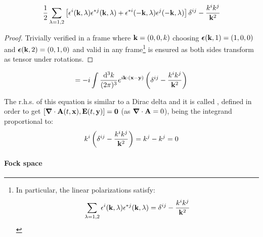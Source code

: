 %
%
\begin{lemma}[before upper = {\tcbtitle}]{}{}
  \begin{equation}
    \frac{1}{2} \sum_{\lambda = 1,2} \left[ \epsilon^i(\mathbf{k},\lambda) \epsilon^{*j}(\mathbf{k},\lambda) + \epsilon^{*i}(-\mathbf{k},\lambda) \epsilon^j(-\mathbf{k},\lambda) \right] \delta^{ij} - \frac{k^i k^j}{\mathbf{k}^2}
  \end{equation}
\end{lemma}

\begin{proofbox}
  \begin{proof}
    Trivially verified in a frame where $ \mathbf{k} = (0,0,k) $ choosing $ \boldsymbol{\epsilon}(\mathbf{k},1) = (1,0,0) $ and $ \boldsymbol{\epsilon}(\mathbf{k},2) = (0,1,0) $ and valid in any frame\footnote{In particular, the linear polarizations satisfy:
    \begin{equation}
      \sum_{\lambda = 1,2} \epsilon^i(\mathbf{k},\lambda) \epsilon^{*j}(\mathbf{k},\lambda) = \delta^{ij} - \frac{k^i k^j}{\mathbf{k}^2}
    \end{equation}} is ensured as both sides transform as tensor under rotations.
  \end{proof}
\end{proofbox}

\begin{proposition}[before upper = {\tcbtitle}]{}{}
  \begin{equation}
    [A^i(t,\ve{x}) , E^j(t,\ve{y})] = - i \int \frac{\dd^3k}{(2\pi)^3} e^{i \ve{k} \cdot (\ve{x} - \ve{y})} \left( \delta^{ij} - \frac{k^i k^j}{\ve{k}^2} \right)
  \end{equation}
\end{proposition}

The r.h.s. of this equation is similar to a Dirac delta and it is called , defined in order to get $ [\boldsymbol{\nabla}\cdot \mathbf{A}(t,\mathbf{x}) , \mathbf{E}(t,\mathbf{y})] = \mathbf{0} $ (as $ \boldsymbol{\nabla}\cdot \mathbf{A} = 0 $), being the integrand proportional to:
\begin{equation*}
  k^i \left( \delta^{ij} - \frac{k^i k^j}{\mathbf{k}^2} \right) = k^j - k^j = 0
\end{equation*}

\paragraph{Fock space}

